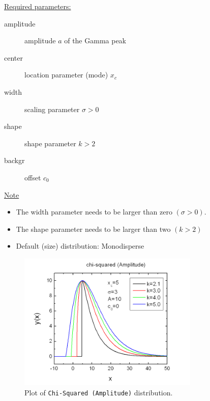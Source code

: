 \vspace{5mm}

\underline{Required parameters:}
\begin{description}
    \item[amplitude] amplitude $a$ of the Gamma peak
    \item[center] location parameter (mode) $x_c$
    \item[width] scaling parameter $\sigma>0$
    \item[shape] shape parameter $k>2$
    \item[backgr] offset $c_0$
\end{description}

\underline{Note}
\begin{itemize}
  \item The width parameter needs to be larger than zero $(\sigma>0)$.
  \item The shape parameter needs to be larger than two $(k>2)$
  \item Default (size) distribution: Monodisperse
\end{itemize}

\begin{figure}[htb]
\begin{center}
\includegraphics[width=0.768\textwidth]{ChiSquaredAmplitude.png}
\end{center}
\caption{Plot of \texttt{Chi-Squared (Amplitude)} distribution.}
\label{fig:ChiSquaredAmplitude}
\end{figure}
